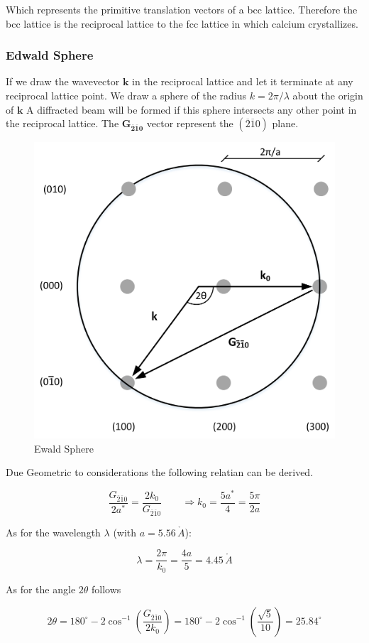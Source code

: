 Which represents the primitive translation vectors of a bcc lattice.
Therefore the bcc lattice is the reciprocal lattice to the fcc lattice
in which calcium crystallizes.


\subsubsection*{Edwald Sphere}

If we draw the wavevector $\mathbf{k}$ in the reciprocal lattice and let it
terminate at any reciprocal lattice point.
We draw a sphere of the radius $k=2\pi/ \lambda$ about the origin of $\mathbf{k}$
A diffracted beam will be formed if this sphere intersects any other point in the 
reciprocal lattice.
The $\mathbf{G_{\overline{2}\overline{1}0}}$ vector represent the 
$(\overline{2}\overline{1}0)$ plane.

\begin{figure}[H]
	\centering
	\includegraphics[width=0.5\linewidth]{Graphics/Chapter2/ewald_sphere.png}
	\caption{Ewald Sphere}
	\label{fig:ewals_sphere}
\end{figure}

Due Geometric to considerations the following relatian can be derived.

$$\frac{G_{\overline{2}\overline{1}0}}{2a^*} = \frac{2 k_0}{G_{\overline{2}\overline{1}0}} \qquad \Rightarrow k_0 = \frac{5a^*}{4} = \frac{5\pi}{2a}$$

As for the wavelength $\lambda$  (with $a = 5.56 \, \mathring{A}$):

$$\lambda = \frac{2\pi}{k_0} = \frac{4a}{5} = 4.45  \, \mathring{A}$$

As for the angle $2\theta$ follows

$$2\theta = 180^\circ - 2 \cos^{-1} \left( \frac{G_{\overline{2}\overline{1}0}}{2k_0} \right) =
    180^\circ - 2 \cos^{-1} \left( \frac{\sqrt{5}}{10} \right) = 25.84 ^\circ$$
